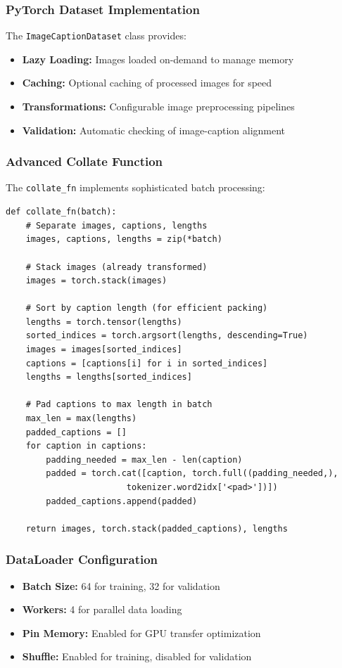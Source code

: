 \documentclass[conference]{IEEEtran}
\begin{document}
\subsubsection{PyTorch Dataset Implementation}
The \texttt{ImageCaptionDataset} class provides:
\begin{itemize}
  \item \textbf{Lazy Loading:} Images loaded on-demand to manage memory
  \item \textbf{Caching:} Optional caching of processed images for speed
  \item \textbf{Transformations:} Configurable image preprocessing pipelines
  \item \textbf{Validation:} Automatic checking of image-caption alignment
\end{itemize}

\subsubsection{Advanced Collate Function}
The \texttt{collate\_fn} implements sophisticated batch processing:
\begin{lstlisting}
def collate_fn(batch):
    # Separate images, captions, lengths
    images, captions, lengths = zip(*batch)

    # Stack images (already transformed)
    images = torch.stack(images)

    # Sort by caption length (for efficient packing)
    lengths = torch.tensor(lengths)
    sorted_indices = torch.argsort(lengths, descending=True)
    images = images[sorted_indices]
    captions = [captions[i] for i in sorted_indices]
    lengths = lengths[sorted_indices]

    # Pad captions to max length in batch
    max_len = max(lengths)
    padded_captions = []
    for caption in captions:
        padding_needed = max_len - len(caption)
        padded = torch.cat([caption, torch.full((padding_needed,),
                        tokenizer.word2idx['<pad>'])])
        padded_captions.append(padded)

    return images, torch.stack(padded_captions), lengths
\end{lstlisting}

\subsubsection{DataLoader Configuration}
\begin{itemize}
  \item \textbf{Batch Size:} 64 for training, 32 for validation
  \item \textbf{Workers:} 4 for parallel data loading
  \item \textbf{Pin Memory:} Enabled for GPU transfer optimization
  \item \textbf{Shuffle:} Enabled for training, disabled for validation
\end{itemize}
\end{document}
